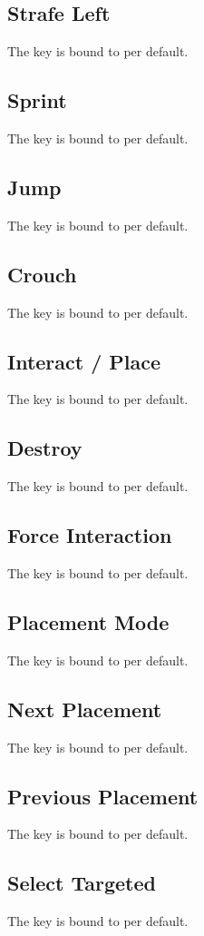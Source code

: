 \subsection{Strafe Left}\label{subsec:controls_strafe left}
The key is bound to
per default.

\subsection{Sprint}\label{subsec:controls_sprint}
The key is bound to
per default.

\subsection{Jump}\label{subsec:controls_jump}
The key is bound to
per default.

\subsection{Crouch}\label{subsec:controls_crouch}
The key is bound to
per default.

\subsection{Interact / Place}\label{subsec:controls_interact / place}
The key is bound to
per default.

\subsection{Destroy}\label{subsec:controls_destroy}
The key is bound to
per default.

\subsection{Force Interaction}\label{subsec:controls_force interaction}
The key is bound to
per default.

\subsection{Placement Mode}\label{subsec:controls_placement mode}
The key is bound to
per default.

\subsection{Next Placement}\label{subsec:controls_next placement}
The key is bound to
per default.

\subsection{Previous Placement}\label{subsec:controls_previous placement}
The key is bound to
per default.

\subsection{Select Targeted}\label{subsec:controls_select targeted}
The key is bound to
per default.
